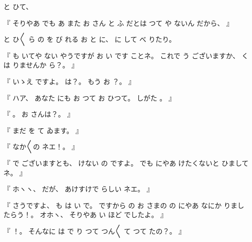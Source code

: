 %
と
ひて、

%
『
そりやあ
でも
あ
また
お
さん
と
ふ
だとは
つて
や
ないん
だから、
』

%
と
ひ〳〵
ら
の
を
び
れる
お
と
に、
%
に
して
べ
りたり。

%
『
も
いてや
ない
やうですが
お
い
です
ことネ。
%
これで
う
ございますか、
%
くは
りませんか
ら？。
』

%
『
いゝえ
ですよ。
%
は？。
%
もう
お
？。
』

%
『
ハア、
%
あなた
にも
お
つて
お
ひつて。
%
しがた
。
』

%
『
。
%
お
さんは？。
』

%
『
まだ
を
て
ゐます。
』

%
『
なか〳〵の
ネエ！。
』

%
『
で
ございますとも、
%
けない
の
ですよ。
%
でも
にやあ
けたくないと
ひましてネ。
』

%
『
ホヽヽ、
%
だが、
%
あけすけで
らしい
ネエ。
』

%
『
さうですよ、
%
も
は
い
で。
%
ですから
の
お
さまの
の
にやあ
なにか
りましたらう！。
%
オホヽ、
%
そりやあ
い
ほど
でしたよ。
』

%
『
！。
%
そんなに
は
で
り
つて
つん〳〵
て
つて
たの？。
』

